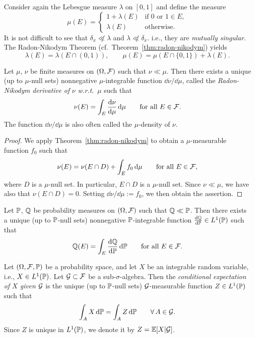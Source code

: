\begin{example}
	Consider again the Lebesgue measure $\lambda$ on $[0,1]$ and define the measure
	\[
		\mu(E) = \begin{cases}
			1 + \lambda(E) &\text{if $0$ or $1\in E$}, \\
			\lambda(E) &\text{otherwise}.
		\end{cases}
	\]
	It is not difficult to see that $\delta_x\not\ll \lambda$ and $\lambda\not\ll \delta_x$. i.e., they are \emph{mutually singular}. The Radon-Nikodym Theorem (cf.~Theorem~\ref{thm:radon-nikodym}) yields
	\[
		\lambda(E) = \lambda(E\cap (0,1)),\qquad \mu(E) = \mu(E\cap \{0,1\}) + \lambda(E).
	\]
\end{example}


\begin{theorem}\label{thm:radon-nikodym-2}
	Let $\mu$, $\nu$ be finite measures on $(\Omega,\mathcal F)$ such that $\nu\ll \mu$. Then there exists a unique (up to $\mu$-null sets) nonnegative $\mu$-integrable function $\dd\nu/\dd\mu$, called the \emph{Radon-Nikodym derivative of $\nu$ w.r.t.\ $\mu$} such that
	\[
		\nu(E) = \int_E \frac{\mathrm{d}\nu}{\mathrm{d}\mu}\,\mathrm{d}\mu\qquad\text{for all $E\in\mathcal F$}.
	\]
	The function $\dd\nu/\dd\mu$ is also often called the $\mu$-density of $\nu$.
\end{theorem}
\begin{proof}
	We apply Theorem~\ref{thm:radon-nikodym} to obtain a $\mu$-measurable function $f_0$ such that
	\[
		\nu(E) = \nu(E\cap D) + \int_E f_0\,\mathrm{d}\mu \qquad\text{for all $E\in\mathcal F$},
	\]
	where $D$ is a $\mu$-null set. In particular, $E\cap D$ is a $\mu$-null set. Since $\nu\ll \mu$, we have also that $\nu(E\cap D)=0$. Setting $\dd\nu/\dd\mu:= f_0$, we then obtain the assertion.
\end{proof}

\begin{theorem} 
	Let $\mathbb P$, $\mathbb Q$ be probability measures on $(\Omega,\mathcal F)$ such that $\mathbb Q\ll \mathbb P$. Then there exists a unique (up to $\mathbb P$-null sets) nonnegative $\mathbb P$-integrable function $\frac{\mathrm{d}\mathbb Q}{\mathrm{d}\mathbb P}\in L^1(\mathbb P)$ such that
	\[
		\mathbb Q(E) = \int_E \frac{\mathrm{d}\mathbb Q}{\mathrm{d}\mathbb P}\,\mathrm{d}\mathbb P\qquad\text{for all $E\in\mathcal F$}.
	\]
\end{theorem}


\begin{definition}\label{def:conditional_expectation}
	Let $(\Omega,\mathcal F,\mathbb P)$ be a probability space, and let $X$ be an integrable random variable, i.e., $X\in L^1(\mathbb P)$. Let $\mathcal G\subset\mathcal F$ be a sub-$\sigma$-algebra. Then the \emph{conditional expectation of $X$ given $\mathcal G$} is the unique (up to $\mathbb P$-null sets) $\mathcal G$-measurable function $Z\in L^1(\mathbb P)$ such that
	\[
		\int_A X\,\mathrm{d}\mathbb P = \int_A Z\,\mathrm{d}\mathbb P\qquad\forall\,A\in\mathcal G.
	\]
	Since $Z$ is unique in $L^1(\mathbb P)$, we denote it by $Z=\mathbb E[X|\mathcal G]$.
\end{definition}

